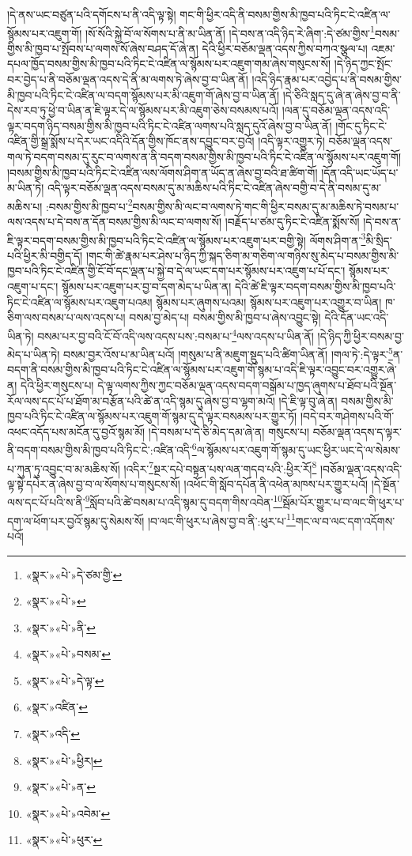 །དེ་ནས་ཡང་བཙུན་པའི་དགོངས་པ་ནི་འདི་ལྟ་སྟེ། གང་གི་ཕྱིར་འདི་ནི་བསམ་གྱིས་མི་ཁྱབ་པའི་ཏིང་ངེ་འཛིན་ལ་སྙོམས་པར་འཇུག་གོ། །སོ་སོའི་སྐྱེ་བོ་ལ་སོགས་པ་ནི་མ་ཡིན་ནོ། །དེ་བས་ན་འདི་ཉིད་རེ་ཞིག་:དེ་ཙམ་གྱིས་\footnote{«སྣར་»«པེ་»དེ་ཙམ་གྱི་}བསམ་གྱིས་མི་ཁྱབ་པ་སྤོབས་པ་ལགས་སོ་ཞེས་བཤད་དོ་ཞེ་ན། དེའི་ཕྱིར་བཅོམ་ལྡན་འདས་ཀྱིས་བཀའ་སྩལ་པ། འཇམ་དཔལ་ཁྱོད་བསམ་གྱིས་མི་ཁྱབ་པའི་ཏིང་ངེ་འཛིན་ལ་སྙོམས་པར་འཇུག་གམ་ཞེས་གསུངས་སོ། །དེ་ཉིད་ཀྱང་སྤོང་བར་བྱེད་པ་ནི་བཅོམ་ལྡན་འདས་དེ་ནི་མ་ལགས་ཏེ་ཞེས་བྱ་བ་ཡིན་ནོ། །འདི་ཉིད་རྣམ་པར་འབྱེད་པ་ནི་བསམ་གྱིས་མི་ཁྱབ་པའི་ཏིང་ངེ་འཛིན་ལ་བདག་སྙོམས་པར་མི་འཇུག་གོ་ཞེས་བྱ་བ་ཡིན་ནོ། །དེ་ཅིའི་སླད་དུ་ཞེ་ན་ཞེས་བྱ་བ་ནི་དེས་རབ་ཏུ་ཕྱེ་བ་ཡིན་ན་ཇི་ལྟར་དེ་ལ་སྙོམས་པར་མི་འཇུག་ཅེས་བསམས་པའོ། །ལན་དུ་བཅོམ་ལྡན་འདས་འདི་ལྟར་བདག་ཉིད་བསམ་གྱིས་མི་ཁྱབ་པའི་ཏིང་ངེ་འཛིན་ལགས་པའི་སླད་དུའོ་ཞེས་བྱ་བ་ཡིན་ནོ། །གོང་དུ་ཏིང་ངེ་འཛིན་གྱི་སྒྲ་སྨོས་པ་དེར་ཡང་འདིའི་དོན་གྱིས་ཁོང་ནས་དབྱུང་བར་བྱའོ། །འདི་ལྟར་འགྱུར་ཏེ། བཅོམ་ལྡན་འདས་གལ་ཏེ་བདག་བསམ་དུ་རུང་བ་ལགས་ན་ནི་བདག་བསམ་གྱིས་མི་ཁྱབ་པའི་ཏིང་ངེ་འཛིན་ལ་སྙོམས་པར་འཇུག་གོ། །བསམ་གྱིས་མི་ཁྱབ་པའི་ཏིང་ངེ་འཛིན་ལས་ལོགས་ཤིག་ན་ཡོད་ན་ཞེས་བྱ་བའི་ཐ་ཚིག་གོ། །དོན་འདི་ཡང་ཡོད་པ་མ་ཡིན་ཏེ། འདི་ལྟར་བཅོམ་ལྡན་འདས་བསམ་དུ་མ་མཆིས་པའི་ཏིང་ངེ་འཛིན་ཞེས་བགྱི་བ་དེ་ནི་བསམ་དུ་མ་མཆིས་པ། :བསམ་གྱིས་མི་ཁྱབ་པ་\footnote{«སྣར་»«པེ་»}བསམ་གྱིས་མི་ལང་བ་ལགས་ཏེ་གང་གི་ཕྱིར་བསམ་དུ་མ་མཆིས་ཏེ་བསམ་པ་ལས་འདས་པ་དེ་བས་ན་དོན་བསམ་གྱིས་མི་ལང་བ་ལགས་སོ། །བརྗོད་པ་ཙམ་དུ་ཏིང་ངེ་འཛིན་སྨོས་སོ། །དེ་བས་ན་ཇི་ལྟར་བདག་བསམ་གྱིས་མི་ཁྱབ་པའི་ཏིང་ངེ་འཛིན་ལ་སྙོམས་པར་འཇུག་པར་བགྱི་སྟེ། ལོགས་ཤིག་ན་\footnote{«སྣར་»«པེ་»ནི་}མི་སྲིད་པའི་ཕྱིར་མི་བགྱིད་དོ། །གང་གི་ཚེ་རྣམ་པར་ཤེས་པ་ཉིད་ཀྱི་སྐད་ཅིག་མ་གཅིག་ལ་གཉིས་སུ་མེད་པ་བསམ་གྱིས་མི་ཁྱབ་པའི་ཏིང་ངེ་འཛིན་གྱི་ངོ་བོ་དང་ལྡན་པ་སྐྱེ་བ་དེ་ལ་ཡང་དག་པར་སྙོམས་པར་འཇུག་པ་པོ་དང་། སྙོམས་པར་འཇུག་པ་དང་། སྙོམས་པར་འཇུག་པར་བྱ་བ་དག་མེད་པ་ཡིན་ན། དེའི་ཚེ་ཇི་ལྟར་བདག་བསམ་གྱིས་མི་ཁྱབ་པའི་ཏིང་ངེ་འཛིན་ལ་སྙོམས་པར་འཇུག་པའམ། སྙོམས་པར་ཞུགས་པའམ། སྙོམས་པར་འཇུག་པར་འགྱུར་བ་ཡིན། ཁ་ཅིག་ལས་བསམ་པ་ལས་འདས་པ། བསམ་བྱ་མེད་པ། བསམ་གྱིས་མི་ཁྱབ་པ་ཞེས་འབྱུང་སྟེ། དེའི་དོན་ཡང་འདི་ཡིན་ཏེ། བསམ་པར་བྱ་བའི་ངོ་བོ་འདི་ལས་འདས་པས་:བསམ་པ་\footnote{«སྣར་»«པེ་»བསམ་}ལས་འདས་པ་ཡིན་ནོ། །དེ་ཉིད་ཀྱི་ཕྱིར་བསམ་བྱ་མེད་པ་ཡིན་ཏེ། བསམ་བྱར་འོས་པ་མ་ཡིན་པའོ། །གསུམ་པ་ནི་མཇུག་སྡུད་པའི་ཚིག་ཡིན་ནོ། །གལ་ཏེ་:དེ་ལྟར་\footnote{«སྣར་»«པེ་»དེ་ལྟ་}ན་བདག་ནི་བསམ་གྱིས་མི་ཁྱབ་པའི་ཏིང་ངེ་འཛིན་ལ་སྙོམས་པར་འཇུག་གོ་སྙམ་པ་འདི་ཇི་ལྟར་འབྱུང་བར་འགྱུར་ཞེ་ན། དེའི་ཕྱིར་གསུངས་པ། དེ་ལྟ་ལགས་ཀྱིས་ཀྱང་བཅོམ་ལྡན་འདས་བདག་བསྒོམ་པ་ཁྱད་ཞུགས་པ་ཐོབ་པའི་སྔོན་རོལ་ལས་དང་པོ་པ་ཐོག་མ་བརྩོན་པའི་ཚེ་ན་འདི་སྙམ་དུ་ཞེས་བྱ་བ་ལྷག་མའོ། །དེ་ཇི་ལྟ་བུ་ཞེ་ན། བསམ་གྱིས་མི་ཁྱབ་པའི་ཏིང་ངེ་འཛིན་ལ་སྙོམས་པར་འཇུག་གོ་སྙམ་དུ་དེ་ལྟར་བསམས་པར་གྱུར་ཏོ། །བདེ་བར་གཤེགས་པའི་གོ་འཕང་འདོད་པས་མངོན་དུ་བྱའོ་སྙམ་མོ། །དེ་བསམ་པ་དེ་ཅི་མེད་དམ་ཞེ་ན། གསུངས་པ། བཅོམ་ལྡན་འདས་ད་ལྟར་ནི་བདག་བསམ་གྱིས་མི་ཁྱབ་པའི་ཏིང་ངེ་:འཛིན་འདི་\footnote{«སྣར་»འཛིན་}ལ་སྙོམས་པར་འཇུག་གོ་སྙམ་དུ་ཡང་ཕྱིར་ཡང་དེ་ལ་སེམས་པ་ཀུན་ཏུ་འབྱུང་བ་མ་མཆིས་སོ། །འདིར་\footnote{«སྣར་»འདི་}སྔར་དཔེ་བསྟན་པས་ལན་གདབ་པའི་:ཕྱིར་རོ།\footnote{«སྣར་»«པེ་»ཕྱིར།} །བཅོམ་ལྡན་འདས་འདི་ལྟ་སྟེ་དཔེར་ན་ཞེས་བྱ་བ་ལ་སོགས་པ་གསུངས་སོ། །འཕོང་གི་སློབ་དཔོན་ནི་འཕེན་མཁས་པར་གྱུར་པའོ། །དེ་སྔོན་ལས་དང་པོ་པའི་ས་ནི་\footnote{«སྣར་»«པེ་»ན་}སློབ་པའི་ཚེ་བསམ་པ་འདི་སྙམ་དུ་བདག་གིས་འབེན་\footnote{«སྣར་»«པེ་»འབེམ་}སྦོམ་པོར་གྱུར་པ་བ་ལང་གི་ཕུར་པ་དག་ལ་ཕོག་པར་བྱའོ་སྙམ་དུ་སེམས་སོ། །བ་ལང་གི་ཕུར་པ་ཞེས་བྱ་བ་ནི་:ཕུར་པ་\footnote{«སྣར་»«པེ་»ཕུར་}གང་ལ་བ་ལང་དག་འདོགས་པའོ། 